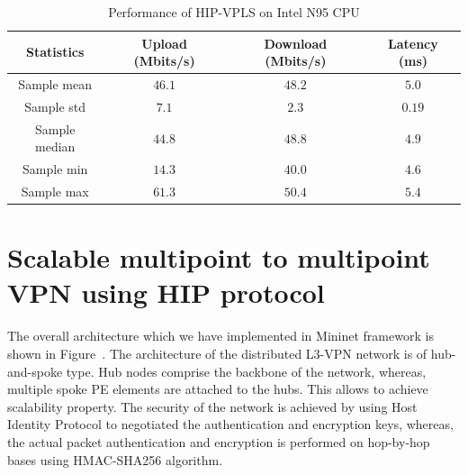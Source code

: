 \begin{table}
    \centering
    \begin{tabular}{|c|c|c|c|}
    \hline
    Statistics     & Upload (Mbits/s)        & Download (Mbits/s)     & Latency (ms) \\\hline
    Sample mean    & $46.1$                  & $48.2$                 & $5.0$         \\
    Sample std     & $7.1$                   & $2.3$                  & $0.19$        \\
    Sample median  & $44.8$                  & $48.8$                 & $4.9$         \\
    Sample min     & $14.3$                  & $40.0$                 & $4.6$         \\
    Sample max     & $61.3$                  & $50.4$                 & $5.4$         \\
    \hline
    \end{tabular}
    \caption{Performance of HIP-VPLS on Intel N95 CPU}  
    \label{tab:vpls-performance}
\end{table}




\section{Scalable multipoint to multipoint VPN using HIP protocol}

The overall architecture which we have implemented in
Mininet framework is shown in Figure~\cite{fig:l3vpn}. The architecture
of the distributed L3-VPN network is of hub-and-spoke type.
Hub nodes comprise the backbone of the network, whereas,
multiple spoke PE elements are attached to the hubs. This
allows to achieve scalability property. The security of the 
network is achieved by using Host Identity Protocol to negotiated
the authentication and encryption keys, whereas, the actual packet authentication
and encryption is performed on hop-by-hop bases using HMAC-SHA256
algorithm. 

